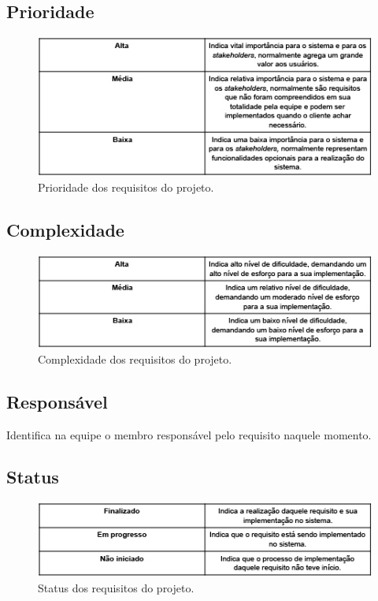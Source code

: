 \subsection{Prioridade}
  \begin{figure}[!htbp]
    \centering
    \includegraphics[scale=0.5]{editaveis/figuras/tabela_prioridade}
    \caption[Prioridade dos requisitos do projeto.]{Prioridade dos requisitos do projeto. \footnotemark}
    \label{tabela_prioridade}
  \end{figure}
\subsection{Complexidade}
  \begin{figure}[!htbp]
    \centering
    \includegraphics[scale=0.5]{editaveis/figuras/tabela_complexidade}
    \caption[Complexidade dos requisitos do projeto.]{Complexidade dos requisitos do projeto. \footnotemark}
    \label{tabela_complexidade}
  \end{figure}
\subsection{Responsável}
Identifica na equipe o membro responsável pelo requisito naquele momento.
\subsection{Status}
  \begin{figure}[!htbp]
    \centering
    \includegraphics[scale=0.5]{editaveis/figuras/tabela_status}
    \caption[Status dos requisitos do projeto.]{Status dos requisitos do projeto. \footnotemark}
    \label{tabela_status}
  \end{figure}
